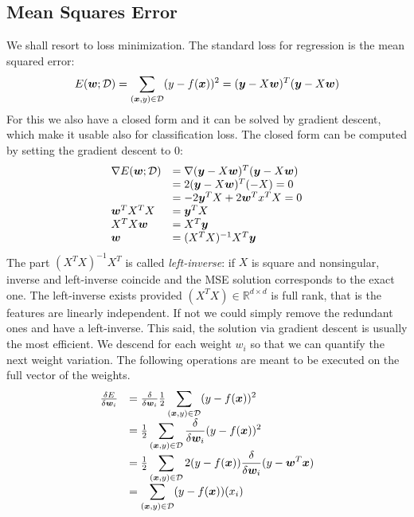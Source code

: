\subsection{Mean Squares Error}
We shall resort to loss minimization. The standard loss for regression is the mean squared error:
\[E(\bm{w};\mathcal{D})=\displaystyle\sum_{(\bm{x},y)\in\mathcal{D}}(y-f(\bm{x}))^2=(\bm{y}-X\bm{w})^T(\bm{y}-X\bm{w})\]
For this we also have a closed form and it can be solved by gradient descent, which make it usable also for classification loss. \newline
The closed form can be computed by setting the gradient descent to 0:
\begin{equation*}
  \begin{array}{ll}
    \nabla E(\bm{w};\mathcal{D})&=\nabla (\bm{y}-X\bm{w})^T(\bm{y}-X\bm{w})\\
                                  &=2(\bm{y}-X\bm{w})^T(-X)=0\\
                                  &=-2\bm{y}^TX+2\bm{w}^Tx^TX=0\\
    \bm{w}^TX^TX                &=\bm{y}^TX\\
    X^TX\bm{w}                  &=X^T\bm{y}\\
    \bm{w}                      &=(X^TX)^{-1}X^T\bm{y}
  \end{array}
\end{equation*}
The part $(X^TX)^{-1}X^T$ is called \textit{left-inverse}: if $X$ is square and nonsingular, inverse and left-inverse coincide and the MSE solution corresponds to the exact one. \newline
The left-inverse exists provided $(X^TX)\in\mathbb{R}^{d\times d}$ is full rank, that is the features are linearly independent. If not we could simply remove the redundant ones and have a left-inverse. \newline
This said, the solution via gradient descent is usually the most efficient. We descend for each weight $w_i$ so that we can quantify the next weight variation. The following operations are meant to be executed on the full vector of the weights. 
\[
  \begin{array}{ll}
    \frac{\delta E}{\delta\bm{w}_i}&=\frac{\delta}{\delta\bm{w}_i}\frac{1}{2}\displaystyle\sum_{(\bm{x},y)\in\mathcal{D}}(y-f(\bm{x}))^2\\
                                     &=\frac{1}{2}\displaystyle\sum_{(\bm{x},y)\in\mathcal{D}}\frac{\delta}{\delta\bm{w}_i}(y-f(\bm{x}))^2\\
                                     &=\frac{1}{2}\displaystyle\sum_{(\bm{x},y)\in\mathcal{D}}2(y-f(\bm{x}))\frac{\delta}{\delta\bm{w}_i}(y-\bm{w}^T\bm{x})\\
                                     &=\displaystyle\sum_{(\bm{x},y)\in\mathcal{D}}(y-f(\bm{x}))(x_i)\\
  \end{array}
\]
%
%
%
